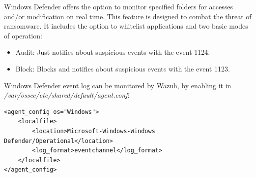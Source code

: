Windows Defender offers the option to monitor specified folders for accesses and/or modification on real time.
This feature is designed to combat the threat of ransomware.
It includes the option to whitelist applications and two basic modes of operation:
\begin{itemize}
	\item Audit: Just notifies about suspicious events with the event 1124.
	\item Block: Blocks and notifies about suspicious events with the event 1123.
\end{itemize}
\linej
Windows Defender event log can be monitored by Wazuh, by enabling it in \textit{/var/ossec/etc/shared/default/agent.conf}:
\begin{lstlisting}[style=xml]
<agent_config os="Windows">
	<localfile>
		<location>Microsoft-Windows-Windows Defender/Operational</location>
		<log_format>eventchannel</log_format>
	</localfile>
</agent_config>
\end{lstlisting}
\linej

